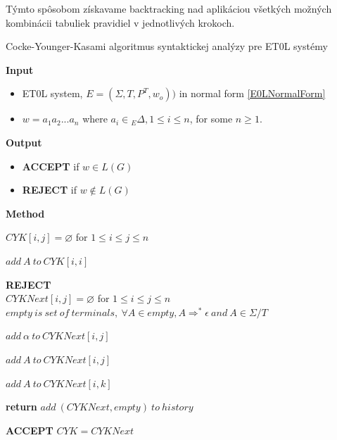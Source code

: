 Týmto spôsobom získavame backtracking nad aplikáciou všetkých možných kombinácii tabuliek pravidiel v jednotlivých krokoch.

\begin{algorithm}
\caption{Cocke-Younger-Kasami algoritmus syntaktickej analýzy pre ET0L systémy}
\label{CYKET0L}

\textbf{Input}
\begin{itemize}[noitemsep]
    \item ET0L system, \(E = (\Sigma, T, P^T, w_o))\) in normal form \ref{E0LNormalForm}
    \item \(w = a_1a_2...a_n\)  where  \(a_i \in {}_E\Delta, 1 \leq i \leq n \), for some \(n \geq 1\).
\end{itemize}
\textbf{Output} 
\begin{itemize}[noitemsep]
    \item \textbf{ACCEPT} if \(w \in L(G)\)
    \item \textbf{REJECT} if \(w\notin L(G)\)
\end{itemize}
\textbf{Method}
\begin{algorithmic}
\State $ CYK[i,j] = \varnothing$ for $1 \leq i \leq j \leq n $

        \State $add\ A\ to\ CYK[i,i]$
    \EndIf
\EndFor
{}
\State {}
\EndFor
\EndFor

\State \textbf{REJECT}
\\
\State $ CYKNext[i,j] = \varnothing$ for $1 \leq i \leq j \leq n $
\State $ empty\ is\ set\ of\ terminals,\ \forall A \in empty, A \Rightarrow^* \epsilon\ and\ A \in \Sigma / T$

\Repeat

\State
\State $add\ \alpha\ to\ CYKNext[i,j]$
\EndIf

\State $add\ A\ to\ CYKNext[i,j]$
\EndIf

\State $add\ A\ to\ CYKNext[i,k]$
\EndIf
{}

    \State \textbf{return}
\Else
    \State $add\ (CYKNext, empty)\ to\ history$
\EndIf

\State \Return
\EndIf
{}
    \State \textbf{ACCEPT}
\Else
    \State $ CYK = CYKNext$
        \State {}
    \EndFor
\EndIf


\EndFunction

\end{algorithmic}
\end{algorithm}

